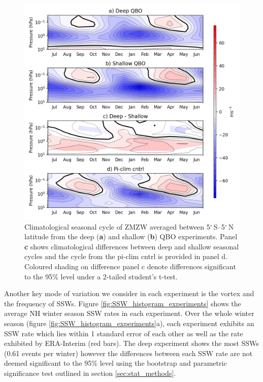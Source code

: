 \begin{figure}[h!]
\begin{center}
\noindent\includegraphics[width = 0.75\linewidth]{Figures/Figures-deepQBO/SAO_seasonal_cycles.png}
\caption[Climatological seasonal cycle of the SAO in QBO experiments]{Climatological seasonal cycle of ZMZW averaged between 5$^{\circ}$\,S--5$^{\circ}$\,N latitude from the deep (\textbf{a}) and shallow (\textbf{b}) QBO experiments. Panel \textbf{c} shows climatological differences between deep and shallow seasonal cycles and the cycle from the pi-clim cntrl is provided in panel d. Coloured shading on difference panel c denote differences significant to the 95\% level under a 2-tailed student's t-test.}
\label{fig:experiment_SAOs}
\end{center}
\end{figure}

Another key mode of variation we consider in each experiment is the vortex and the frequency of SSWs. Figure \ref{fig:SSW_histogram_experiments} shows the average NH winter season SSW rates in each experiment. Over the whole winter season (figure \ref{fig:SSW_histogram_experiments}a), each experiment exhibits an SSW rate which lies within 1 standard error of each other as well as the rate exhibited by ERA-Interim (red bars). The deep experiment shows the most SSWs (0.61 events per winter) however the differences between each SSW rate are not deemed significant to the 95\% level using the bootstrap and parametric significance test outlined in section \ref{sec:stat_methods}. 

